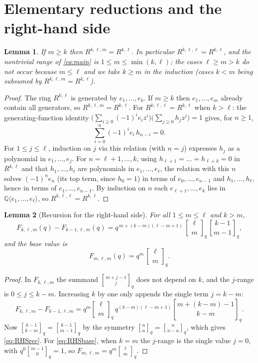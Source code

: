 \documentclass{amsart}
\newtheorem{lemma}{Lemma}
\theoremstyle{definition}
\newcommand{\qbin}[2]{\genfrac{[}{]}{0pt}{}{#1}{#2}_q}
\newcommand{\Q}{\mathbb{Q}}
\newcommand{\rkl}{R^{k,\ell}}
\newcommand{\Rklm}{R^{k,\ell,m}}
\begin{document}
\section{Elementary reductions and the right-hand side}

\begin{lemma}\label{lem:trivial}
If $m\ge k$ then $\Rklm=\rkl$. In particular $R^{k,\ell,\ell}=\rkl$, and the
nontrivial range of \eqref{eq:main} is $1\le m\le\min(k,\ell)$; the cases
$\ell\ge m>k$ do not occur because $m\le\ell$ and we take $k\ge m$ in the
induction (cases $k<m$ being subsumed by $\Rklm=\rkl$).
\end{lemma}

\begin{proof}
The ring $\rkl$ is generated by $e_1,\dots,e_k$. If $m\ge k$ then
$e_1,\dots,e_m$ already contain all generators, so $\Rklm=\rkl$.
For $R^{k,\ell,\ell}=\rkl$ when $k>\ell$: the generating-function identity
$\big(\sum_{i\ge0}(-1)^i e_i z^i\big)\big(\sum_{j\ge0}h_j z^j\big)=1$ gives, for
$n\ge1$,
\[
\sum_{i=0}^{n}(-1)^i e_i\,h_{n-i}=0 .
\]
For $1\le j\le\ell$, induction on $j$ via this relation (with $n=j$) expresses
$h_j$ as a polynomial in $e_1,\dots,e_j$. For $n=\ell+1,\dots,k$, using
$h_{\ell+1}=\dots=h_{\ell+k}=0$ in $\rkl$ and that $h_1,\dots,h_\ell$ are
polynomials in $e_1,\dots,e_\ell$, the relation with this $n$ solves $(-1)^n e_n$
(its top term, since $h_0=1$) in terms of $e_0,\dots,e_{n-1}$ and $h_1,\dots,h_\ell$,
hence in terms of $e_1,\dots,e_{n-1}$. By induction on $n$ each
$e_{\ell+1},\dots,e_k$ lies in $\Q\langle e_1,\dots,e_\ell\rangle$, so
$R^{k,\ell,\ell}=\rkl$.
\end{proof}

\begin{lemma}[Recursion for the right-hand side]\label{lem:RHSrec}
For all $1\le m\le\ell$ and $k>m$,
\begin{equation}\label{eq:RHSrec}
F_{k,\ell,m}(q)-F_{k-1,\ell,m}(q)
= q^{\,m+(k-m)(\ell-m+1)}\,\qbin{\ell}{m}\,\qbin{k-1}{m-1},
\end{equation}
and the base value is
\begin{equation}\label{eq:RHSbase}
F_{m,\ell,m}(q)=q^{m}\,\qbin{\ell}{m}.
\end{equation}
\end{lemma}

\begin{proof}
In $F_{k,\ell,m}$ the summand $\qbin{m+j-1}{j}$ does not depend on $k$, and the
$j$-range is $0\le j\le k-m$. Increasing $k$ by one only appends the single term
$j=k-m$:
\[
F_{k,\ell,m}-F_{k-1,\ell,m}
= q^{m}\qbin{\ell}{m}\,q^{(k-m)(\ell-m+1)}\qbin{m+(k-m)-1}{\,k-m\,}.
\]
Now $\qbin{k-1}{k-m}=\qbin{k-1}{m-1}$ by the symmetry $\qbin{n}{a}=\qbin{n}{n-a}$,
which gives \eqref{eq:RHSrec}. For \eqref{eq:RHSbase}, when $k=m$ the $j$-range is
the single value $j=0$, with $q^{0}\qbin{m-1}{0}=1$, so
$F_{m,\ell,m}=q^{m}\qbin{\ell}{m}$.
\end{proof}
\end{document}
